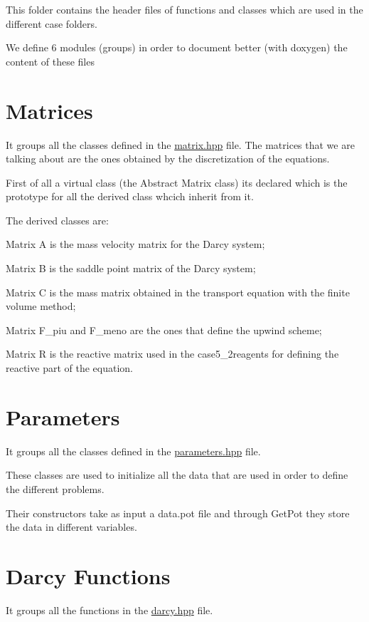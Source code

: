 This folder contains the header files of functions and classes which are used in the different case folders.

We define 6 modules (groups) in order to document better (with doxygen) the content of these files

\section*{Matrices}

It groups all the classes defined in the \hyperlink{matrix_8hpp}{matrix.\+hpp} file. The matrices that we are talking about are the ones obtained by the discretization of the equations.

First of all a virtual class (the Abstract Matrix class) it\textquotesingle{}s declared which is the prototype for all the derived class whcich inherit from it.

The derived classes are\+:

Matrix A is the mass velocity matrix for the Darcy system;

Matrix B is the saddle point matrix of the Darcy system;

Matrix C is the mass matrix obtained in the transport equation with the finite volume method;

Matrix F\+\_\+piu and F\+\_\+meno are the ones that define the upwind scheme;

Matrix R is the reactive matrix used in the case5\+\_\+2reagents for defining the reactive part of the equation.

\section*{Parameters}

It groups all the classes defined in the \hyperlink{parameters_8hpp_source}{parameters.\+hpp} file.

These classes are used to initialize all the data that are used in order to define the different problems.

Their constructors take as input a data.\+pot file and through Get\+Pot they store the data in different variables.

\section*{Darcy Functions}

It groups all the functions in the \hyperlink{darcy_8hpp_source}{darcy.\+hpp} file.

